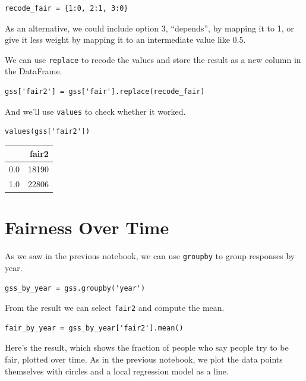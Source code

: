 \begin{lstlisting}[]
recode_fair = {1:0, 2:1, 3:0}
\end{lstlisting}

As an alternative, we could include option 3, ``depends'', by mapping it
to 1, or give it less weight by mapping it to an intermediate value like
0.5.

We can use \passthrough{\lstinline!replace!} to recode the values and
store the result as a new column in the DataFrame.

\begin{lstlisting}[]
gss['fair2'] = gss['fair'].replace(recode_fair)
\end{lstlisting}

And we'll use \passthrough{\lstinline!values!} to check whether it
worked.

\begin{lstlisting}[]
values(gss['fair2'])
\end{lstlisting}

\begin{tabular}{lr}
\midrule
{} &  fair2 \\
\midrule
0.0 &  18190 \\
1.0 &  22806 \\
\midrule
\end{tabular}

\hypertarget{fairness-over-time}{%
\section{Fairness Over Time}\label{fairness-over-time}}

As we saw in the previous notebook, we can use
\passthrough{\lstinline!groupby!} to group responses by year.

\begin{lstlisting}[]
gss_by_year = gss.groupby('year')
\end{lstlisting}

From the result we can select \passthrough{\lstinline!fair2!} and
compute the mean.

\begin{lstlisting}[]
fair_by_year = gss_by_year['fair2'].mean()
\end{lstlisting}

Here's the result, which shows the fraction of people who say people try
to be fair, plotted over time. As in the previous notebook, we plot the
data points themselves with circles and a local regression model as a
line.

